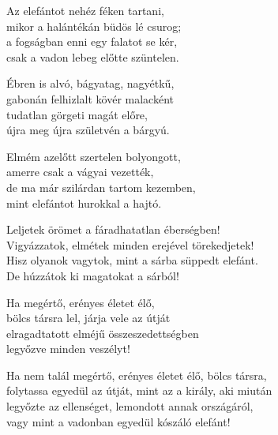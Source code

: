 \begin{dhpverse}

 Az elefántot nehéz féken tartani,\\
mikor a halántékán büdös lé csurog;\\
a fogságban enni egy falatot se kér,\\
csak a vadon lebeg előtte szüntelen.

 Ébren is alvó, bágyatag, nagyétkű,\\
gabonán felhizlalt kövér malacként\\
tudatlan görgeti magát előre,\\
újra meg újra születvén a bárgyú.

 Elmém azelőtt szertelen bolyongott,\\
amerre csak a vágyai vezették,\\
de ma már szilárdan tartom kezemben,\\
mint elefántot hurokkal a hajtó.

 Leljetek örömet a fáradhatatlan éberségben!\\
Vigyázzatok, elmétek minden erejével törekedjetek!\\
Hisz olyanok vagytok, mint a sárba süppedt elefánt.\\
De húzzátok ki magatokat a sárból!

 Ha megértő, erényes életet élő,\\
bölcs társra lel, járja vele az útját\\
elragadtatott elméjű összeszedettségben\\
legyőzve minden veszélyt!

 Ha nem talál megértő, erényes életet élő, bölcs társra,\\
folytassa egyedül az útját, mint az a király, aki miután\\
legyőzte az ellenséget, lemondott annak országáról,\\
vagy mint a vadonban egyedül kószáló elefánt!

\end{dhpverse}
\newpage
